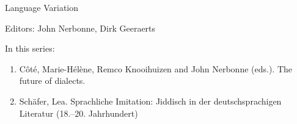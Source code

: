 {\large Language Variation}

\bigskip

Editors: John Nerbonne, Dirk Geeraerts

\bigskip

In this series:

\begin{enumerate}
\item Côté, Marie-Hélène, Remco Knooihuizen and John Nerbonne (eds.). The future of dialects.
\item Schäfer, Lea. Sprachliche Imitation: Jiddisch in der deutschsprachigen Literatur (18.--20. Jahrhundert)
\end{enumerate}


\vfill



